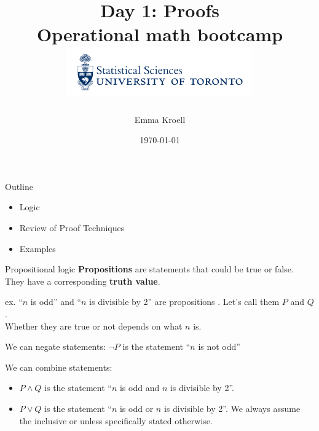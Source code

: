 \documentclass [aspectratio=169]{beamer}
\title[]{Day 1: Proofs \\ {\large Operational math bootcamp}\\ \includegraphics[width=8cm]{dept_logo.png}\vspace{-1em}}
\author[]{Emma Kroell}
\institute[]{University of Toronto}
\date{\today}
\begin{document}
{
\begin{frame}
    \titlepage
\end{frame}
}

\begin{frame}{Outline}
    \begin{itemize}
    	\item Logic
        \item Review of Proof Techniques
        \item Examples
    \end{itemize}
\end{frame}


\begin{frame}{Propositional logic}{}
{\bf Propositions} are statements that could be true or false. They have a corresponding {\bf truth value}. \\

\vspace{1em}

ex. ``$n$ is odd'' and ``$n$ is divisible by 2'' are propositions . Let's call them $P$ and $Q$. \\

Whether they are true or not depends on what $n$ is. \\

\vspace{1em}
\pause

We can  negate statements: $\neg P$ is the statement ``$n$ is not odd''

\pause
\vspace{1em}
 We can combine statements: 
 \begin{itemize}
 \item $P \wedge Q$ is the statement ``$n$ is odd and $n$ is divisible by 2''.
 \item $P \vee Q$ is the statement ``$n$ is odd or $n$ is divisible by 2''. We always assume the inclusive or unless specifically stated otherwise.
\end{itemize}
\end{frame}
\end{document}
